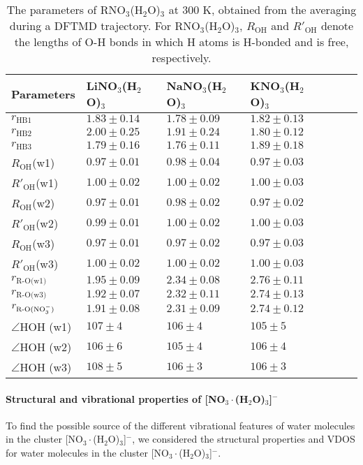 %
\begin{table}[H] %
\centering
\caption{\label{tab:table_rnitrate_3w}%
The parameters of RNO$_3$(H$_2$O)$_3$ at 300 K, obtained from the averaging during a DFTMD trajectory. 
  For RNO$_3$(H$_2$O)$_3$, $R_\text{OH}$ and $R'_\text{OH}$ 
  denote the lengths of O-H bonds in which H atoms is H-bonded and is free, respectively.
  }
\begin{tabular}{l*{4}lll}
Parameters & LiNO$_3$(H$_2$O)$_3$& NaNO$_3$(H$_2$O)$_3$ & KNO$_3$(H$_2$O)$_3$\\
\hline
$r_\text{HB1}$ & $1.83\pm0.14$ & $1.78\pm0.09$ & $1.82\pm0.13$\\
$r_\text{HB2}$ & $2.00\pm0.25$ & $1.91\pm0.24$ & $1.80\pm0.12$\\
$r_\text{HB3}$ &$1.79\pm0.16$ & $1.76\pm0.11$ & $1.89\pm0.18$\\
$R_\text{OH}$(w1) &$0.97\pm0.01$ &$0.98\pm0.04$ &$0.97\pm0.03$ \\
$R'_\text{OH}$(w1) &$1.00\pm0.02$ &$1.00\pm0.02$ & $1.00\pm0.03$ \\
$R_\text{OH} $(w2) &$0.97\pm0.01$ &$0.98\pm0.02$ &$0.97\pm0.02$ \\ 
$R'_\text{OH}$(w2) &$0.99\pm0.01$ &$1.00\pm0.02$ & $1.00\pm0.03$ \\
$R_\text{OH}$(w3) &$0.97\pm0.01$ & $0.97\pm0.02$&$0.97\pm0.03$ \\
$R'_\text{OH}$(w3) &$1.00\pm0.02$ &$1.00\pm0.02$ & $1.00\pm0.03$ \\
$r_\text{R-O(w1)}$ & $1.95\pm0.09$ & $2.34\pm0.08$ & $2.76\pm0.11$\\
$r_\text{R-O(w3)}$ & $1.92\pm0.07$ & $2.32\pm0.11$ & $2.74\pm0.13$\\
$r_\text{R-O(NO$_3^-$)}$ & $1.91\pm0.08$ & $2.31\pm0.09$ & $2.74\pm0.12$ \\
$\angle$HOH (w1) &$107\pm4$ & $106\pm4$ &$105\pm5$ \\
$\angle$HOH (w2) &$106\pm6$ & $105\pm4$ &$106\pm4$ \\
$\angle$HOH (w3) &$108\pm5$ & $106\pm3$ &$106\pm3$ 
\end{tabular}
\end{table}
\paragraph{Structural and vibrational properties of [NO$_3\cdot$(H$_2$O)$_3$]$^-$}
To find the possible source of the different vibrational features of water molecules in the 
cluster [NO$_3\cdot$(H$_2$O)$_3$]$^-$, we considered the structural properties and VDOS for water molecules 
in the cluster [NO$_3\cdot$(H$_2$O)$_3$]$^-$.

